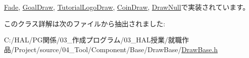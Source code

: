 \mbox{\hyperlink{class_fade_a1579b5b9020344a1131ea11c15f2c0bd}{Fade}}, \mbox{\hyperlink{class_goal_draw_a6e003277ed44eb9c800a616b6acbcb20}{Goal\+Draw}}, \mbox{\hyperlink{class_tutorial_logo_draw_af69405fcc8b20684a19e982726d93ffa}{Tutorial\+Logo\+Draw}}, \mbox{\hyperlink{class_coin_draw_a6157b17bf1706b85156aad0d88acfd7e}{Coin\+Draw}}, \mbox{\hyperlink{class_draw_null_a0149bcf84a34b138642ab7975ae46f30}{Draw\+Null}}で実装されています。



このクラス詳解は次のファイルから抽出されました\+:\begin{DoxyCompactItemize}
\item 
C\+:/\+H\+A\+L/\+P\+G関係/03\+\_\+作成プログラム/03\+\_\+\+H\+A\+L授業/就職作品/\+Project/source/04\+\_\+\+Tool/\+Component/\+Base/\+Draw\+Base/\mbox{\hyperlink{_draw_base_8h}{Draw\+Base.\+h}}\end{DoxyCompactItemize}
